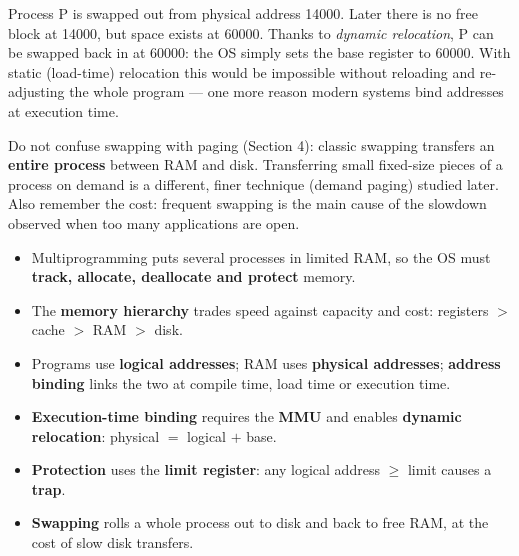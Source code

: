 \documentclass[11pt]{article}
\newcounter{popsec}
\newcounter{popsub}
\newcommand{\courssub}[1]{%
  \stepcounter{popsub}%
  \par\vspace{9pt}\noindent{\popxbold\fontsize{11.5}{13}\selectfont\color{popink}{\color{poporange}\thepopsec.\thepopsub}\hspace{6pt}#1}\par\nopagebreak\vspace{4pt}
}
\begin{document}
\begin{exemplebox}
Process P is swapped out from physical address 14000. Later there is no free block at 14000, but space exists at 60000. Thanks to \emph{dynamic relocation}, P can be swapped back in at 60000: the OS simply sets the base register to 60000. With static (load-time) relocation this would be impossible without reloading and re-adjusting the whole program --- one more reason modern systems bind addresses at execution time.
\end{exemplebox}

\begin{attention}
Do not confuse swapping with paging (Section 4): classic swapping transfers an \textbf{entire process} between RAM and disk. Transferring small fixed-size pieces of a process on demand is a different, finer technique (demand paging) studied later. Also remember the cost: frequent swapping is the main cause of the slowdown observed when too many applications are open.
\end{attention}

\courssub{Summary and Consolidation}

\begin{aretenir}
\begin{itemize}
\item Multiprogramming puts several processes in limited RAM, so the OS must \textbf{track, allocate, deallocate and protect} memory.
\item The \textbf{memory hierarchy} trades speed against capacity and cost: registers $>$ cache $>$ RAM $>$ disk.
\item Programs use \textbf{logical addresses}; RAM uses \textbf{physical addresses}; \textbf{address binding} links the two at compile time, load time or execution time.
\item \textbf{Execution-time binding} requires the \textbf{MMU} and enables \textbf{dynamic relocation}: physical $=$ logical $+$ base.
\item \textbf{Protection} uses the \textbf{limit register}: any logical address $\ge$ limit causes a \textbf{trap}.
\item \textbf{Swapping} rolls a whole process out to disk and back to free RAM, at the cost of slow disk transfers.
\end{itemize}
\end{aretenir}
\end{document}
